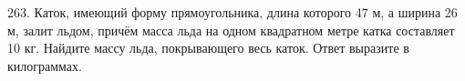 263. Каток, имеющий форму прямоугольника, длина которого 47 м, а ширина 26 м, залит льдом, причём масса льда на одном квадратном метре катка составляет 10 кг. Найдите массу льда, покрывающего весь каток. Ответ выразите в килограммах.\\
